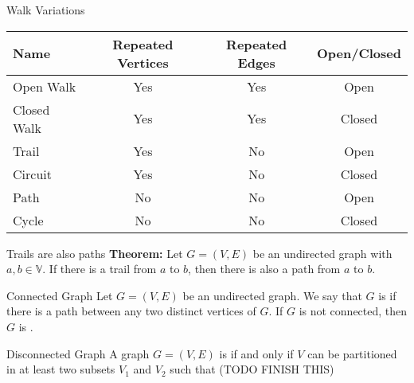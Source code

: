 \documentclass[12pt]{report}
\begin{document}
\begin{genbox}{Walk Variations}
	\iffalse
	Let $x$-$y$ be a walk in the undirected graph $G = (V,E)$.
	\begin{dfnitems}
		\item If no edge in the $x$-$y$ walk is repeated, then $x$-$y$ walk is called an $x$-$y$ \dfntxt{trail}
		\item A closed $x$-$x$ trail is called a \dfntxt{circuit}. We will assume all circuits of interest have at least one edge
		\item If no vertex of an $x$-$y$ walk occurs more than once, the walk is called an $x$-$y$ \dfntxt{path}. If $x=y$, the closed path is called a \dfntxt{cycle}
	\end{dfnitems}
	\fi
	\begin{center}\begin{tabular}{lccc}
		Name & Repeated Vertices & Repeated Edges & Open/Closed \\ \hline
		Open Walk & Yes & Yes & Open \\
		Closed Walk & Yes & Yes & Closed \\
		Trail & Yes & No & Open \\
		Circuit & Yes & No & Closed \\
		Path & No & No & Open \\
		Cycle & No & No & Closed
	\end{tabular}\end{center}
\end{genbox}



\begin{thmbox}{Trails are also paths}
	\textbf{Theorem:} Let $G = (V,E)$ be an undirected graph with $a,b \in \mathbb{V}$. If there is a trail from $a$ to $b$, then there is also a path from $a$ to $b$.
\end{thmbox}

\begin{dfnbox}{Connected Graph}
	Let $G = (V,E)$ be an undirected graph. We say that $G$ is  if there is a path between any two distinct vertices of $G$. If $G$ is not connected, then $G$ is .
\end{dfnbox}

\begin{dfnbox}{Disconnected Graph}
	A graph $G=(V,E)$ is  if and only if $V$ can be partitioned in at least two subsets $V_1$ and $V_2$ such that (TODO FINISH THIS)
\end{dfnbox}
\end{document}
